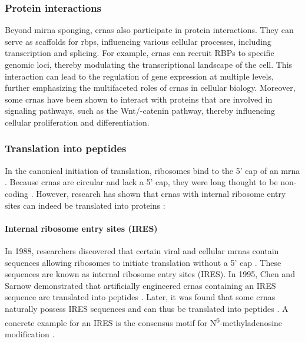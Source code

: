 \subsubsection{Protein interactions}
Beyond \gls{mirna} sponging, \glspl{crna} also participate in protein
interactions.
They can serve as scaffolds for \glspl{rbp}, influencing various cellular
processes, including transcription and
splicing\supercite{li_comprehensive_2017,qu_emerging_2017}.
For example, \glspl{crna} can recruit RBPs to specific genomic loci, thereby
modulating the transcriptional landscape of the
cell\supercite{li_comprehensive_2017}.
This interaction can lead to the regulation of gene expression at multiple
levels, further emphasizing the multifaceted roles of \glspl{crna} in cellular
biology\supercite{zhang_important_2024,he_targeting_2021}.
Moreover, some \glspl{crna} have been shown to interact with proteins that are
involved in signaling pathways, such as the Wnt/\textbeta{}-catenin pathway,
thereby influencing cellular proliferation and
differentiation\supercite{peng_novel_2021}.

\subsubsection{Translation into peptides}
In the canonical initiation of translation, ribosomes bind to the 5' cap of an
\gls{mrna} \supercite{hinnebusch_mechanism_2012}.
Because \glspl{crna} are circular and lack a 5' cap, they were long thought to
be non-coding \supercite{bao_regulatory_2019,greene_circular_2017}.
However, research has shown that \glspl{crna} with internal ribosome entry
sites can indeed be translated into proteins \supercite{chen_expanding_2020}:

\paragraph{Internal ribosome entry sites (IRES)} In 1988, researchers
discovered that certain viral and cellular \glspl{mrna} contain sequences
allowing ribosomes to initiate translation without a 5' cap
\supercite{pelletier_internal_1988, jang_segment_1988}.
These sequences are known as internal ribosome entry sites (IRES).
In 1995, Chen and Sarnow demonstrated that artificially engineered \glspl{crna}
containing an IRES sequence are translated into peptides
\supercite{chen_initiation_1995}.
Later, it was found that some \glspl{crna} naturally possess IRES sequences and
can thus be translated into peptides
\supercite{chen_expanding_2020,legnini_circ-znf609_2017,pamudurti_translation_2017}.
A concrete example for an IRES is the consensus motif for
N\textsuperscript{6}-methyladenosine modification
\supercite{yang_extensive_2017}.

